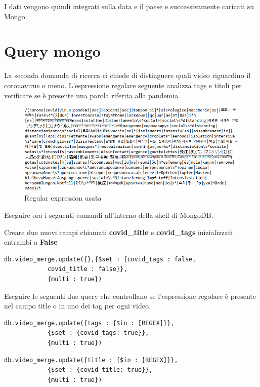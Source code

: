 \documentclass[10pt, a4paper,openany]{article}
\begin{document}
I dati vengono quindi integrati sulla data e il paese e successivamente caricati su Mongo.

\section*{Query mongo}

La seconda domanda di ricerca ci chiede di distinguere quali video riguardino il coronavirus o meno. L'espressione regolare seguente analizza tags e titoli per verificare se è presente una parola riferita alla pandemia.

\begin{figure}[H]
	\centering
	\includegraphics[height=0.4 \linewidth]{er.png}
	\caption{Regular expression usata}
\end{figure}

Eseguire ora i seguenti comandi all'interno della shell di MongoDB.

Creare due nuovi campi chiamati \textbf{covid\_title} e \textbf{covid\_tags} inizializzati entrambi a \textbf{False} 

\begin{Verbatim}[frame=single,baselinestretch=0.1]
db.video_merge.update({},{$set : {covid_tags : false, 
			covid_title : false}},
			{multi : true})
\end{Verbatim}
Eseguire le seguenti due query che controllano se l'espressione regolare è presente nel campo title o in uno dei tag per ogni video.

\begin{Verbatim}[frame=single,baselinestretch=0.1]
db.video_merge.update({tags : {$in : [REGEX]}}, 
			{$set : {covid_tags: true}}, 
			{multi : true})
\end{Verbatim}
 \begin{Verbatim}[frame=single,baselinestretch=0.1]
db.video_merge.update({title : {$in : [REGEX]}}, 
			{$set : {covid_title: true}}, 
			{multi : true})
\end{Verbatim}
\end{document}

